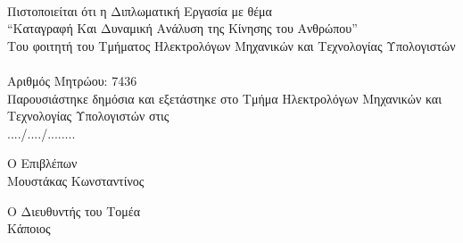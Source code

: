 \thispagestyle{empty}
\newpage

\thispagestyle{empty}
\clearpage\mbox{}\clearpage

\begin{center}
    {}\\[1cm]
    Πιστοποιείται ότι η Διπλωματική Εργασία με θέμα\\[0.5cm]
    \textquotedblleft Καταγραφή Και Δυναμική Ανάλυση της Κίνησης του Ανθρώπου\textquotedblright \\[1cm]
    Του φοιτητή του Τμήματος Ηλεκτρολόγων Μηχανικών και Τεχνολογίας Υπολογιστών\\[0.5cm]
    \\[10pt]
    Αριθμός Μητρώου: 7436\\[2cm]
    Παρουσιάστηκε δημόσια και εξετάστηκε στο Τμήμα Ηλεκτρολόγων Μηχανικών και Τεχνολογίας Υπολογιστών στις\\
    ..../..../........\\[7cm]
\end{center}

\begin{minipage}[t]{0.5\textwidth}
    \begin{flushleft}
        Ο Επιβλέπων\\
        Μουστάκας Κωνσταντίνος
    \end{flushleft}
\end{minipage}%
\begin{minipage}[t]{0.5\textwidth}
    \begin{flushright}
        Ο Διευθυντής του Τομέα\\
        Κάποιος
    \end{flushright}
\end{minipage}%

\thispagestyle{empty}
\newpage
